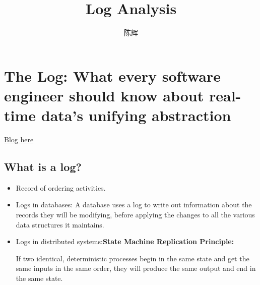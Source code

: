 \documentclass{article}
\title{Log Analysis}
\author{陈辉}
\date{}
\begin{document}
\maketitle
\tableofcontents
\newpage
\section{The Log: What every software engineer should know about real-time data's unifying abstraction}
\href{https://engineering.linkedin.com/distributed-systems/log-what-every-software-engineer-should-know-about-real-time-datas-unifying}{Blog here}
\subsection{What is a log?}
\begin{itemize}
\item Record of ordering activities.
\item Logs in databases: A database uses a log to write out information about the records they will be modifying, before applying the changes to all the various data structures it maintains.
\item Logs in distributed systems:\textbf{State Machine Replication Principle:}

If two identical, deterministic processes begin in the same state and get the same inputs in the same order, they will produce the same output and end in the same state.

\end{itemize}
\end{document}

